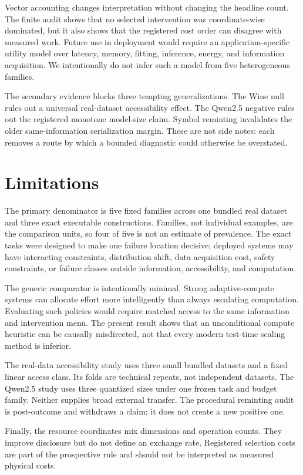 \documentclass[10pt]{article}
\begin{document}
Vector accounting changes interpretation without changing the headline count. The finite audit shows that no selected intervention was coordinate-wise dominated, but it also shows that the registered cost order can disagree with measured work. Future use in deployment would require an application-specific utility model over latency, memory, fitting, inference, energy, and information acquisition. We intentionally do not infer such a model from five heterogeneous families.

The secondary evidence blocks three tempting generalizations. The Wine null rules out a universal real-dataset accessibility effect. The Qwen2.5 negative rules out the registered monotone model-size claim. Symbol reminting invalidates the older same-information serialization margin. These are not side notes: each removes a route by which a bounded diagnostic could otherwise be overstated.

\section{Limitations}

The primary denominator is five fixed families across one bundled real dataset and three exact executable constructions. Families, not individual examples, are the comparison units, so four of five is not an estimate of prevalence. The exact tasks were designed to make one failure location decisive; deployed systems may have interacting constraints, distribution shift, data acquisition cost, safety constraints, or failure classes outside information, accessibility, and computation.

The generic comparator is intentionally minimal. Strong adaptive-compute systems can allocate effort more intelligently than always escalating computation. Evaluating such policies would require matched access to the same information and intervention menu. The present result shows that an unconditional compute heuristic can be causally misdirected, not that every modern test-time scaling method is inferior.

The real-data accessibility study uses three small bundled datasets and a fixed linear access class. Its folds are technical repeats, not independent datasets. The Qwen2.5 study uses three quantized sizes under one frozen task and budget family. Neither supplies broad external transfer. The procedural reminting audit is post-outcome and withdraws a claim; it does not create a new positive one.

Finally, the resource coordinates mix dimensions and operation counts. They improve disclosure but do not define an exchange rate. Registered selection costs are part of the prospective rule and should not be interpreted as measured physical costs.
\end{document}

